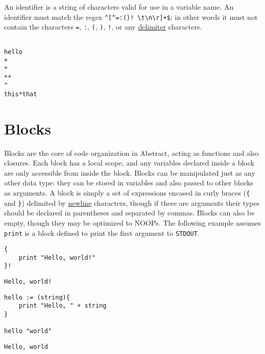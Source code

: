 \documentclass[letterpaper,titlepage]{scrreprt}
\begin{document}
An identifier is a string of characters valid for use in a variable name. An identifier must match the regex \lstinline{^[^=:()! \t\n\r]+$}; in other words it must not contain the characters \lstinline{=}, \lstinline{:}, \lstinline{(}, \lstinline{)}, \lstinline{!}, or any \hyperref[def:delimiter]{delimiter} characters.

\begin{lstlisting}[caption={Example identifiers},label=lst:identifiers]

hello
+
*
**
^
this*that

\end{lstlisting}

\section{Blocks}
\label{sec:Blocks}

Blocks are the core of code organization in Abstract, acting as functions and also closures. Each block has a local scope, and any variables declared inside a block are only accessible from inside the block. Blocks can be manipulated just as any other data type: they can be stored in variables and also passed to other blocks as arguments. A block is simply a set of expressions encased in curly braces (\lstinline|{| and \lstinline|}|) delimited by \hyperref[def:newline]{newline} characters, though if there are arguments their types should be declared in parentheses and separated by commas. Blocks can also be empty, though they may be optimized to NOOPs. The following example assumes \lstinline{print} is a block defined to print the first argument to \lstinline{STDOUT}.

\begin{lstlisting}[caption={Example block},label=lst:exampleblock]
{
	print "Hello, world!"
}!
\end{lstlisting}
\begin{lstlisting}[caption={Example block output},label=lst:exampleblockoutput]
Hello, world!
\end{lstlisting}

\begin{lstlisting}[caption={Example block with arguments},label=lst:exampleblockarg]
hello := (string){
	print "Hello, " + string
}

hello "world"
\end{lstlisting}
\begin{lstlisting}[caption={Example block with arguments output},label=lst:exampleblockargoutput]
Hello, world
\end{lstlisting}
\end{document}

